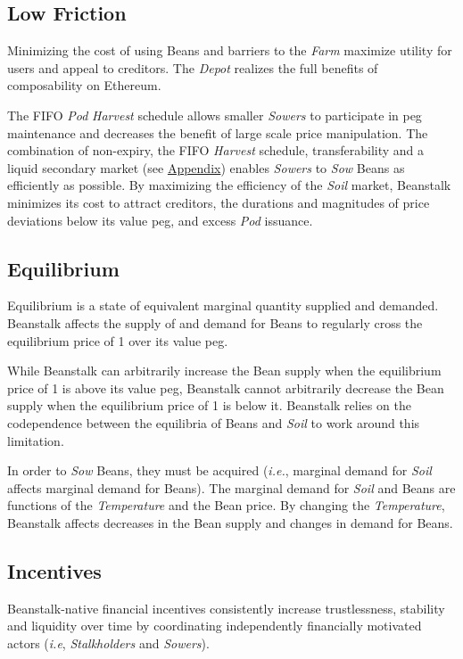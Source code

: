 \documentclass[tikz]{article}
\newcommand{\term}[1]{\textsl{#1}}
\newcommand{\Bean}{} %
\begin{document}
\vspace*{-1.75mm}
\subsection{Low Friction}
\vspace*{-1.75mm}
Minimizing the cost of using Beans and barriers to the \term{Farm} maximize utility for users and appeal to creditors. The \term{Depot} realizes the full benefits of composability on Ethereum.

The FIFO \term{Pod} \term{Harvest} schedule allows smaller \term{Sowers} to participate in peg maintenance and decreases the benefit of large scale price manipulation. The combination of non-expiry, the FIFO \term{Harvest} schedule, transferability and a liquid secondary market (see \hyperlink{subsection.14.5}{Appendix}) enables \term{Sowers} to \term{Sow} Beans as efficiently as possible. By maximizing the efficiency of the \term{Soil} market, Beanstalk minimizes its cost to attract creditors, the durations and magnitudes of price deviations below its value peg, and excess \term{Pod} issuance.

\vspace*{-1.75mm}
\subsection{Equilibrium}
\vspace*{-1.75mm}
Equilibrium is a state of equivalent marginal quantity supplied and demanded. Beanstalk affects the supply of and demand for Beans to regularly cross the equilibrium price of \Bean1 over its value peg. 

While Beanstalk can arbitrarily increase the Bean supply when the equilibrium price of \Bean1 is above its value peg, Beanstalk cannot arbitrarily decrease the Bean supply when the equilibrium price of \Bean1 is below it. Beanstalk relies on the codependence between the equilibria of Beans and \term{Soil} to work around this limitation. 

In order to \term{Sow} Beans, they must be acquired (\term{i.e.}, marginal demand for \term{Soil} affects marginal demand for Beans). The marginal demand for \term{Soil} and Beans are functions of the \term{Temperature} and the Bean price. By changing the \term{Temperature}, Beanstalk affects decreases in the Bean supply and changes in demand for Beans. 

\subsection{Incentives}
Beanstalk-native financial incentives consistently increase trustlessness, stability and liquidity over time by coordinating independently financially motivated actors (\term{i.e}, \term{Stalkholders} and \term{Sowers}). 
\end{document}

